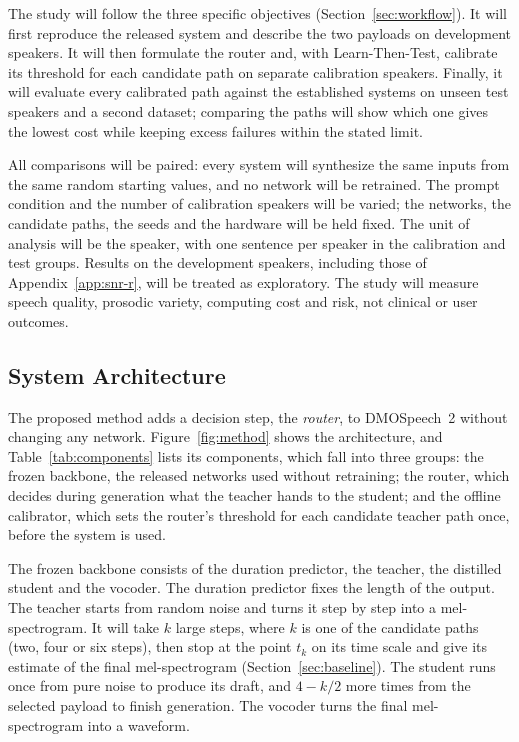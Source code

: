 The study will follow the three specific objectives (Section~\ref{sec:workflow}). It will first reproduce the released system and describe the two payloads on development speakers. It will then formulate the router and, with Learn-Then-Test, calibrate its threshold for each candidate path on separate calibration speakers. Finally, it will evaluate every calibrated path against the established systems on unseen test speakers and a second dataset; comparing the paths will show which one gives the lowest cost while keeping excess failures within the stated limit.

All comparisons will be paired: every system will synthesize the same inputs from the same random starting values, and no network will be retrained. The prompt condition and the number of calibration speakers will be varied; the networks, the candidate paths, the seeds and the hardware will be held fixed. The unit of analysis will be the speaker, with one sentence per speaker in the calibration and test groups. Results on the development speakers, including those of Appendix~\ref{app:snr-r}, will be treated as exploratory. The study will measure speech quality, prosodic variety, computing cost and risk, not clinical or user outcomes.

\subsection{System Architecture}
\label{sec:architecture}

The proposed method adds a decision step, the \emph{router}, to DMOSpeech~2 without changing any network. Figure~\ref{fig:method} shows the architecture, and Table~\ref{tab:components} lists its components, which fall into three groups: the frozen backbone, the released networks used without retraining; the router, which decides during generation what the teacher hands to the student; and the offline calibrator, which sets the router's threshold for each candidate teacher path once, before the system is used.

The frozen backbone consists of the duration predictor, the teacher, the distilled student and the vocoder. The duration predictor fixes the length of the output. The teacher starts from random noise and turns it step by step into a mel-spectrogram. It will take $k$ large steps, where $k$ is one of the candidate paths (two, four or six steps), then stop at the point $t_k$ on its time scale and give its estimate of the final mel-spectrogram (Section~\ref{sec:baseline}). The student runs once from pure noise to produce its draft, and $4-k/2$ more times from the selected payload to finish generation. The vocoder turns the final mel-spectrogram into a waveform.

